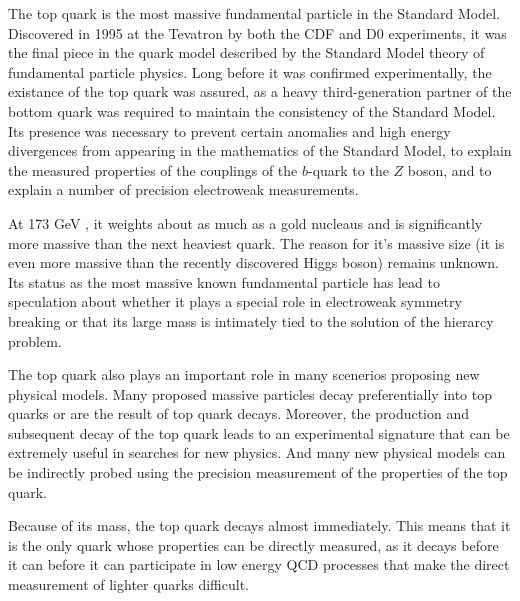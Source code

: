 
%




The top quark is the most massive fundamental particle in the Standard Model.
Discovered in 1995 at the Tevatron by both the CDF and D0 experiments, it was the final piece in the quark model described by the Standard Model theory of fundamental particle physics.
Long before it was confirmed experimentally, the existance of the top quark was assured,
as a heavy third-generation partner of the bottom quark was required to maintain the consistency of the Standard Model.%
Its presence was necessary to prevent certain anomalies and high energy divergences from appearing in the mathematics of the Standard Model,
to explain the measured properties of the couplings of the $b$-quark to the $Z$ boson, and to explain a number of precision electroweak measurements.

At 173 GeV \cite{PARTICLE_DATA_GROUP}, it weights about as much as a gold nucleaus and is significantly more massive than the next heaviest quark.
The reason for it's massive size (it is even more massive than the recently discovered Higgs boson) remains unknown.
Its status as the most massive known fundamental particle has lead to speculation about whether it plays a special role in electroweak symmetry breaking
or that its large mass is intimately tied to the solution of the hierarcy problem.

The top quark also plays an important role in many scenerios proposing new physical models.
Many proposed massive particles decay preferentially into top quarks or are the result of top quark decays.
Moreover, the production and subsequent decay of the top quark leads to an experimental signature that can be extremely useful in searches for new physics.
And many new physical models can be indirectly probed using the precision measurement of the properties of the top quark.

Because of its mass, the top quark decays almost immediately.
This means that it is the only quark whose properties can be directly measured, as it decays before it can before it can participate in low energy QCD processes that make the direct measurement of lighter quarks difficult.

